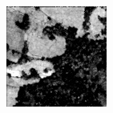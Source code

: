 \documentclass[usenames,dvipsnames,10pt]{beamer}
\begin{document}
\begin{frame}
\begin{minipage}[]{0.3\textwidth}
	\includegraphics[width=\textwidth]{graphics/tfcn-output-06.jpg}
\end{minipage}
\end{frame}
\end{document}
